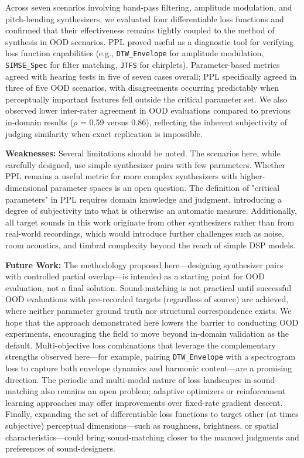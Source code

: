 \documentclass[10pt]{article} %
\newcommand{\SIMSESpec}{\texttt{SIMSE\_\allowbreak Spec}\xspace}
\newcommand{\JTFS}{\texttt{JTFS}\xspace}
\newcommand{\DTWEnv}{\texttt{DTW\_\allowbreak Envelope}\xspace}
\begin{document}
Across seven scenarios involving band-pass filtering, amplitude modulation, and pitch-bending synthesizers, we evaluated four differentiable loss functions and confirmed that their effectiveness remains tightly coupled to the method of synthesis in OOD scenarios. PPL proved useful as a diagnostic tool for verifying loss function capabilities (e.g., \DTWEnv for amplitude modulation, \SIMSESpec for filter matching, \JTFS for chirplets). Parameter-based metrics agreed with hearing tests in five of seven cases overall; PPL specifically agreed in three of five OOD scenarios, with disagreements occurring predictably when perceptually important features fell outside the critical parameter set. We also observed lower inter-rater agreement in OOD evaluations compared to previous in-domain results ($\rho$ = 0.59 versus 0.86), reflecting the inherent subjectivity of judging similarity when exact replication is impossible.

\textbf{Weaknesses:} Several limitations should be noted. The scenarios here, while carefully designed, use simple synthesizer pairs with few parameters. Whether PPL remains a useful metric for more complex synthesizers with higher-dimensional parameter spaces is an open question. The definition of "critical parameters" in PPL requires domain knowledge and judgment, introducing a degree of subjectivity into what is otherwise an automatic measure. Additionally, all target sounds in this work originate from other synthesizers rather than from real-world recordings, which would introduce further challenges such as noise, room acoustics, and timbral complexity beyond the reach of simple DSP models.

\textbf{Future Work:} The methodology proposed here---designing synthesizer pairs with controlled partial overlap---is intended as a starting point for OOD evaluation, not a final solution. Sound-matching is not practical until successful OOD evaluations with pre-recorded targets (regardless of source) are achieved, where neither parameter ground truth nor structural correspondence exists. We hope that the approach demonstrated here lowers the barrier to conducting OOD experiments, encouraging the field to move beyond in-domain validation as the default.  Multi-objective loss combinations that leverage the complementary strengths observed here---for example, pairing \DTWEnv with a spectrogram loss to capture both envelope dynamics and harmonic content---are a promising direction. The periodic and multi-modal nature of loss landscapes in sound-matching also remains an open problem; adaptive optimizers or reinforcement learning approaches may offer improvements over fixed-rate gradient descent. Finally, expanding the set of differentiable loss functions to target other (at times subjective) perceptual dimensions---such as roughness, brightness, or spatial characteristics---could bring sound-matching closer to the nuanced judgments and preferences of sound-designers.




\end{document}
